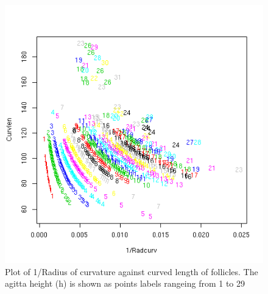 %

\begin{figure}[!h]
  \centering
  \includegraphics[width=1.0\textwidth]{curvxcurvlenxh.png}
  \caption{Plot of  1/Radius of curvature against curved length of follicles. The agitta height (h) is shown as points labels rangeing from 1 to 29}
  \label{fig:curvxcurvlenxh}
\end{figure}

%

